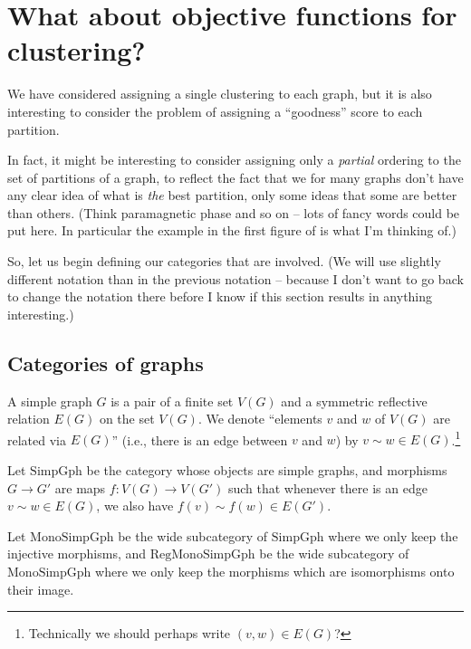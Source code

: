 \documentclass[a4paper,reqno,oneside]{article} %
\begin{document}
\section{What about objective functions for clustering?}
We have considered assigning a single clustering to each graph, but it is also interesting to consider the problem of assigning a ``goodness'' score to each partition.

In fact, it might be interesting to consider assigning only a \emph{partial} ordering to the set of partitions of a graph, to reflect the fact that we for many graphs don't have any clear idea of what is \emph{the} best partition, only some ideas that some are better than others. (Think paramagnetic phase and so on -- lots of fancy words could be put here. In particular the example in the first figure of \cite{moore_2017} is what I'm thinking of.)

So, let us begin defining our categories that are involved. (We will use slightly different notation than in the previous notation -- because I don't want to go back to change the notation there before I know if this section results in anything interesting.)

\subsection{Categories of graphs}

\begin{definition}
A simple graph $G$ is a pair of a finite set $V(G)$ and a symmetric reflective relation $E(G)$ on the set $V(G)$. We denote ``elements $v$ and $w$ of $V(G)$ are related via $E(G)$'' (i.e., there is an edge between $v$ and $w$) by $v \sim w \in E(G)$.\footnote{Technically we should perhaps write $(v,w) \in E(G)$?} 
\end{definition}

\begin{definition}
Let $\mathrm{SimpGph}$ be the category whose objects are simple graphs, and morphisms $G \to G'$ are maps $f: V(G) \to V(G')$ such that whenever there is an edge $v \sim w \in E(G)$, we also have $f(v) \sim f(w) \in E(G')$.

Let $\mathrm{MonoSimpGph}$ be the wide subcategory of $\mathrm{SimpGph}$ where we only keep the injective morphisms, and $\mathrm{RegMonoSimpGph}$ be the wide subcategory of $\mathrm{MonoSimpGph}$ where we only keep the morphisms which are isomorphisms onto their image.
\end{definition}
\end{document}
